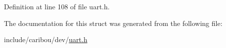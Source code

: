 Definition at line 108 of file uart.\-h.



The documentation for this struct was generated from the following file\-:\begin{DoxyCompactItemize}
\item 
include/caribou/dev/\hyperlink{uart_8h}{uart.\-h}\end{DoxyCompactItemize}

